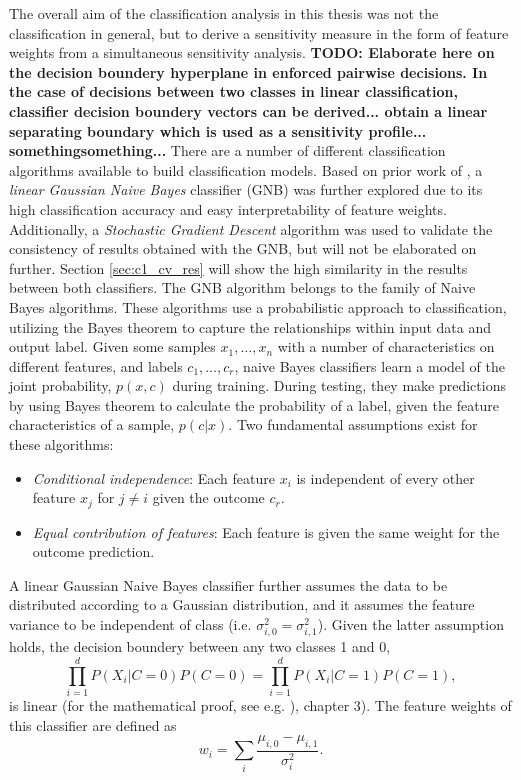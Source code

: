\documentclass[a4paper, 12pt]{scrreprt}
\begin{document}
The overall aim of the classification analysis in this thesis was not the classification in general, but to derive a sensitivity measure in the form of feature weights from a simultaneous sensitivity analysis. \textbf{TODO: Elaborate here on the decision boundery hyperplane in enforced pairwise decisions. In the case of decisions between two classes in linear classification, classifier decision boundery vectors can be derived... obtain a linear separating boundary which is used as a sensitivity profile... somethingsomething...} \newline
There are a number of different classification algorithms available to build classification models. Based on prior work of \textcite{nastase2016}, a \textit{linear Gaussian Naive Bayes} classifier (GNB) was further explored due to its high classification accuracy and easy interpretability of feature weights. Additionally, a \textit{Stochastic Gradient Descent} algorithm was used to validate the consistency of results obtained with the GNB, but will not be elaborated on further. Section \ref{sec:c1_cv_res} will show the high similarity in the results between both classifiers. \newline
The GNB algorithm belongs to the family of Naive Bayes algorithms. These algorithms use a probabilistic approach to classification, utilizing the Bayes theorem to capture the relationships within input data and output label. Given some samples $x_1, \ldots, x_n$ with a number of characteristics on different features, and labels $c_1, \ldots, c_r$, naive Bayes classifiers learn a model of the joint probability, $p(x, c)$ during training. During testing, they make predictions by using Bayes theorem to calculate the probability of a label, given the feature characteristics of a sample, $p(c|x)$. Two fundamental assumptions exist for these algorithms: \newline 
\begin{itemize}
	\item \textit{Conditional independence}: Each feature $x_i$ is independent of every other feature $x_j$ for $j \neq i$ given the outcome $c_r$.
	\item \textit{Equal contribution of features}:  Each feature is given the same weight for the outcome prediction. 
\end{itemize} 
A linear Gaussian Naive Bayes classifier further assumes the data to be distributed according to a Gaussian distribution, and it assumes the feature variance to be independent of class (i.e. $\sigma_{i, 0}^2 = \sigma_{i, 1}^2$). Given the latter assumption holds, the decision boundery between any two classes 1 and 0,
\begin{equation}
\prod_{i=1}^{d} P(X_i |C = 0)P(C=0) = \prod_{i=1}^{d} P(X_i |C = 1)P(C=1),
\end{equation}
is linear (for the mathematical proof, see e.g. \textcite{DBLP:books/daglib/0087929}), chapter 3). The feature weights of this classifier are defined as
\begin{equation}
w_i = \sum_{i}\frac{\mu_{i, 0}-\mu_{i, 1}}{\sigma_{i}^{2}}.
\end{equation}
\end{document}
